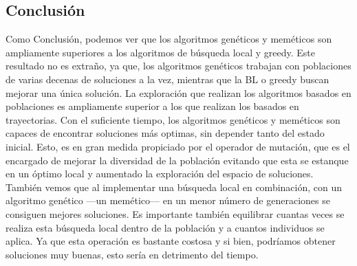 \subsection{Conclusión}
Como Conclusión, podemos ver que los algoritmos genéticos y meméticos son ampliamente superiores a los algoritmos de búsqueda local y greedy. Este resultado no es extraño, ya que, los algoritmos genéticos trabajan con poblaciones de varias decenas de soluciones a la vez, mientras que la BL o greedy buscan mejorar una única solución. La exploración que realizan los algoritmos basados en poblaciones es ampliamente superior a los que realizan los basados en trayectorias. Con el suficiente tiempo, los algoritmos genéticos y meméticos son capaces de encontrar soluciones más optimas, sin depender tanto del estado inicial. Esto, es en gran medida propiciado por el operador de mutación, que es el encargado de mejorar la diversidad de la población evitando que esta se estanque en un óptimo local y aumentado la exploración del espacio de soluciones.
\\
También vemos que al implementar una búsqueda local en combinación, con un algoritmo genético ---un memético--- en un menor número de generaciones se consiguen mejores soluciones. Es importante también equilibrar cuantas veces se realiza esta búsqueda local dentro de la población y a cuantos individuos se aplica. Ya que esta operación es bastante costosa y si bien, podríamos obtener soluciones muy buenas, esto sería en detrimento del tiempo.
